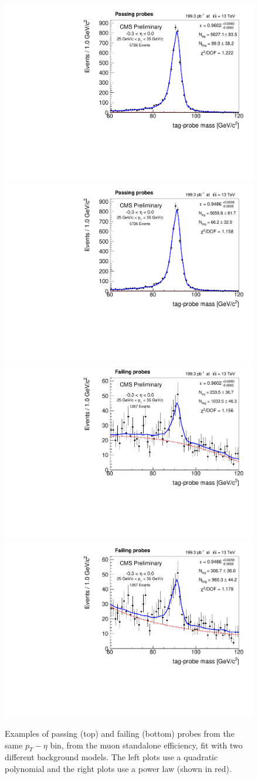 \begin{figure}
\includegraphics[width=.49\linewidth]{plots/efficiency/examples_musta/passetapt_5.pdf}
\includegraphics[width=.49\linewidth]{plots/efficiency/examples_plbkg/passetapt_5.pdf}
\includegraphics[width=.49\linewidth]{plots/efficiency/examples_musta/failetapt_5.pdf}
\includegraphics[width=.49\linewidth]{plots/efficiency/examples_plbkg/failetapt_5.pdf}
\caption{Examples of passing (top) and failing (bottom) probes from the same $p_T-\eta$ bin, from the muon standalone efficiency, fit with two different background models. The left plots use a quadratic polynomial and the right plots use a power law (shown in red).}
\label{fig:eff:musta:fitexample}
\end{figure}
